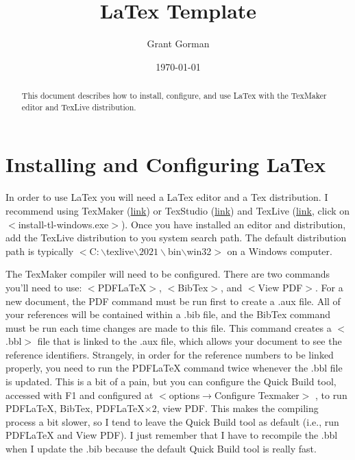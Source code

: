 \documentclass[11pt]{article}		%
\title{LaTex Template}
\author{Grant Gorman}
\date{\today}
\begin{document}
\maketitle

\setlength{\parindent}{0in} %
\setlength{\parskip}{\baselineskip} %

\begin{abstract}
	
	This document describes how to install, configure, and use LaTex with the TexMaker editor and TexLive distribution. 

\end{abstract}

\section{Installing and Configuring LaTex} 
\label{sec:install}
In order to use LaTex you will need a LaTex editor and a Tex distribution. I  recommend using  TexMaker (\href{https://www.xm1math.net/texmaker/index.html}{link}) or TexStudio (\href{https://www.texstudio.org/}{link}) and TexLive (\href{https://www.tug.org/texlive/acquire-netinstall.html}{link}, click on $<$install-tl-windows.exe$>$). Once you have installed an editor and distribution, add the TexLive distribution to you system search path. The default distribution path is typically $<$C$:\backslash $texlive$\backslash 2021\backslash$bin$\backslash$win32$>$ on a Windows computer. 

The TexMaker compiler will need to be configured. There are two commands you'll need to use: $<$PDFLaTeX$>$, $<$BibTex$>$, and $<$View PDF$>$. For a new document, the PDF command must be run first to create a .aux file. All of your references will be contained within a .bib file, and the BibTex command must be run each time changes are made to this file. This command creates a $<$.bbl$>$ file that is linked to the .aux file, which allows your document to see the reference identifiers. Strangely, in order for the reference numbers to be linked properly, you need to run the PDFLaTeX command twice whenever the .bbl file is updated. This is a bit of a pain, but you can configure the Quick Build tool, accessed with F1 and configured at $<$options$\rightarrow$Configure Texmaker$>$
, to run PDFLaTeX, BibTex, PDFLaTeX$\times2$, view PDF. This makes the compiling process a bit slower, so I tend to leave the Quick Build tool as default (i.e., run PDFLaTeX and View PDF). I just remember that I have to recompile the .bbl when I update the .bib because the default Quick Build tool is really fast.
\end{document}
